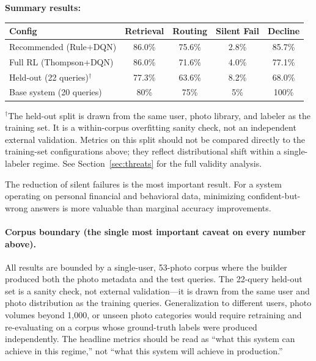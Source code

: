 \documentclass[11pt,letterpaper]{article}
\begin{document}
\vspace{1em}
\noindent\textbf{Summary results:}

\begin{center}
\small
\begin{tabular}{lcccc}
\toprule
\textbf{Config} & \textbf{Retrieval} & \textbf{Routing} & \textbf{Silent Fail} & \textbf{Decline} \\
\midrule
Recommended (Rule+DQN) & 86.0\% & 75.6\% & 2.8\% & 85.7\% \\
Full RL (Thompson+DQN) & 86.0\% & 71.6\% & 4.0\% & 77.1\% \\
Held-out (22 queries)$^{\dag}$ & 77.3\% & 63.6\% & 8.2\% & 68.0\% \\
Base system (20 queries) & 80\% & 75\% & 5\% & 100\% \\
\bottomrule
\end{tabular}

\vspace{0.3em}
{\footnotesize $^{\dag}$The held-out split is drawn from the same user, photo library, and labeler as the training set. It is a within-corpus overfitting sanity check, not an independent external validation. Metrics on this split should not be compared directly to the training-set configurations above; they reflect distributional shift within a single-labeler regime. See Section~\ref{sec:threats} for the full validity analysis.}
\end{center}

The reduction of silent failures is the most important result. For a system operating on personal financial and behavioral data, minimizing confident-but-wrong answers is more valuable than marginal accuracy improvements.

\paragraph{Corpus boundary (the single most important caveat on every number above).} All results are bounded by a single-user, 53-photo corpus where the builder produced both the photo metadata and the test queries. The 22-query held-out set is a sanity check, not external validation---it is drawn from the same user and photo distribution as the training queries. Generalization to different users, photo volumes beyond 1{,}000, or unseen photo categories would require retraining and re-evaluating on a corpus whose ground-truth labels were produced independently. The headline metrics should be read as ``what this system can achieve in this regime,'' not ``what this system will achieve in production.''
\end{document}
